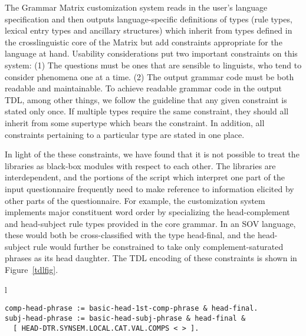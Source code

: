 \documentclass[11pt]{article}
\begin{document}
The Grammar Matrix customization system reads in the user's language
specification and then outputs language-specific definitions of types
(rule types, lexical entry types and ancillary structures) which
inherit from types defined in the crosslinguistic core of the Matrix
but add constraints appropriate for the language at hand. 
Usability considerations put two important constraints on this system:
(1) The questions must be ones that are sensible to linguists,
who tend to consider phenomena one at a time.  
(2) The output grammar code must be both readable and maintainable.
To achieve readable grammar code in the output TDL, among other
things, we follow the guideline that any given constraint is
stated only once.  If multiple types require the same constraint, they
should all inherit from some supertype which bears the constraint.
In addition, all constraints pertaining to a particular type are
stated in one place.

In light of the these constraints, we
have found that it is not possible to treat the libraries as black-box
modules with respect to each other.  The libraries are interdependent,
and the portions of the script which interpret one part of the input
questionnaire frequently need to make reference to information
elicited by other parts of the questionnaire.  For example, the
customization system implements major constituent word order by
specializing the head-complement and head-subject rule types provided
in the core grammar.  In an SOV language, these would both be
cross-classified with the type head-final, and the head-subject rule
would further be constrained to take only complement-saturated phrases
as its head daughter.  The TDL encoding of these constraints is shown
in Figure~\ref{tdlfig}.

\begin{figure*}[ht]
\small
\begin{center}
\begin{tabular}{l}
\begin{minipage}{5in}
\begin{verbatim}
comp-head-phrase := basic-head-1st-comp-phrase & head-final.
subj-head-phrase := basic-head-subj-phrase & head-final &
  [ HEAD-DTR.SYNSEM.LOCAL.CAT.VAL.COMPS < > ].
\end{verbatim}
\end{minipage}\\
\end{tabular}
\end{center}
\caption{Specialized phrase structure rule types for SOV language}
\label{tdlfig}
\end{figure*}
\end{document}
